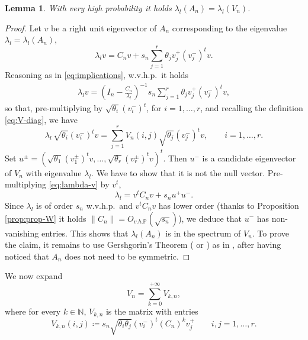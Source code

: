 \documentclass[11pt,oneside]{amsart}
\theoremstyle{plain}
\newtheorem{lemma}[theorem]{Lemma}
\numberwithin{equation}{section}
\newcommand{\wehp}{{w.v.h.p.~}}
\newcommand{\N}{\mathbb{N}}
\newcommand{\p}{\mathbb{P}}
\newcommand{\centered}{C_n}
\newcommand{\scaling}{s_n}
\newcommand{\Ohp}{O_{v.h.\p}}
\begin{document}
\begin{lemma} \label{lem:A-V}
With very high probability it holds $\lambda_l(A_n)=\lambda_l(V_n)$.
\end{lemma}

\begin{proof}%
    Let $v$ be a right unit eigenvector of $A_n$ corresponding to the eigenvalue $\lambda_l=\lambda_l(A_n)$, 
    \begin{equation} \label{eq:lambda-v}
        \lambda_l v = \centered v + \scaling\sum_{j=1}^r \theta_j v_j^+ (v_j^-)^tv.
    \end{equation}
    Reasoning as in \eqref{eq:implications}, \wehp it holds 
    \begin{equation}
    \begin{split}
         \lambda_l v
        = \left(I_n-\frac{\centered}{\lambda_l}\right)^{-1} \scaling\sum_{j=1}^r \theta_jv_j^+ (v_j^-)^t v,
    \end{split}
    \end{equation}
    so that, pre-multiplying by $\sqrt{\theta_i} (v_i^-)^t$, for $i=1,\dots,r$, and recalling the definition \eqref{eq:V-diag}, we have
    \begin{equation}
        \lambda_l \,\sqrt{\theta_i} (v_i^-)^t v   = \sum_{j=1}^r V_{n}(i,j)  \sqrt{\theta_j}(v_j^-)^t v,\qquad i=1,\dots,r.
    \end{equation}
 Set $u^\pm=(\sqrt{\theta_1} (v_1^\pm)^t v,\dots, \sqrt{\theta_r} (v_r^\pm)^t v)^t$. Then $u^-$ is a candidate eigenvector of $V_n$ with eigenvalue $\lambda_l$. We have to show that it is not the null vector. Pre-multiplying \eqref{eq:lambda-v} by $v^t$,
    \begin{equation}
        \lambda_l = v^t \centered v +\scaling u^+  u^-.
    \end{equation}    
    Since $\lambda_l$ is of order $\scaling$ w.v.h.p.\ and $v^t \centered v$ has lower order (thanks to Proposition \ref{prop:prop-W} it holds $\|\centered\|=\Ohp(\sqrt{\scaling})$), we deduce that $u^-$ has non-vanishing entries. This shows that $\lambda_l(A_n)$ is in the spectrum of $V_n$. To prove the claim, it remains to use Gershgorin's  Theorem (\cite[Theorem 1.6]{Varga2004} or \cite[Fact 5.1]{CCH}) as in \cite[Lemma 5.2]{CCH}, after having noticed that $A_n$ does not need to be symmetric.
\end{proof}
We now expand $$V_n = \sum_{k=0}^{+\infty} V_{k,n},$$
where for every $k \in \N$, $V_{k,n}$ is the matrix with entries 
\begin{equation} 
V_{k,n}(i,j)\coloneqq \scaling \sqrt{\theta_i\theta_j}(v_i^-)^t\left( {\centered}\right)^{k}v_j^+ \qquad i,j =1,\dots, r.
\end{equation}
\end{document}
